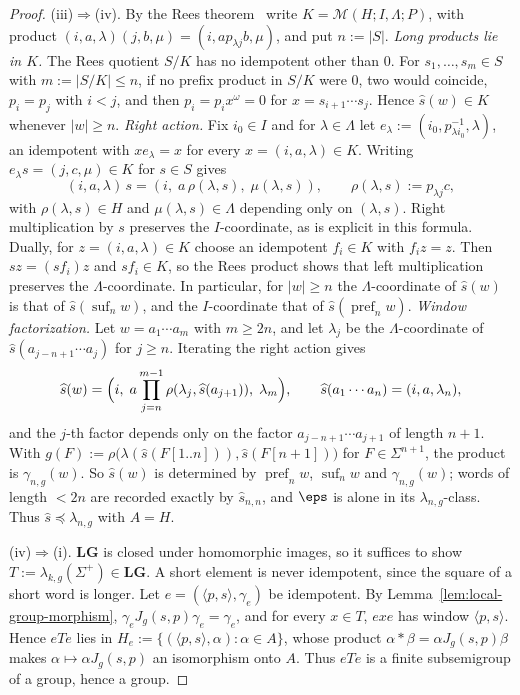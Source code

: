 \begin{proof}
(iii)$\Rightarrow$(iv).  By the Rees theorem~\cite{Howie1995} write
$K=\mathcal M(H;I,\Lambda;P)$, with product
$(i,a,\lambda)(j,b,\mu)=(i,ap_{\lambda j}b,\mu)$, and put $n:=|S|$.
\emph{Long products lie in $K$.}  The Rees quotient $S/K$ has no idempotent
other than $0$.  For $s_1,\ldots,s_m\in S$ with $m:=|S/K|\le n$, if no prefix
product in $S/K$ were $0$, two would coincide, $p_i=p_j$ with $i<j$, and then
$p_i=p_ix^\omega=0$ for $x=s_{i+1}\cdots s_j$.  Hence $\widehat{s}(w)\in K$ whenever
$|w|\ge n$.
\emph{Right action.}  Fix $i_0\in I$ and for $\lambda\in\Lambda$ let
$e_\lambda:=(i_0,p_{\lambda i_0}^{-1},\lambda)$, an idempotent with
$xe_\lambda=x$ for every $x=(i,a,\lambda)\in K$.  Writing
$e_\lambda s=(j,c,\mu)\in K$ for $s\in S$ gives
\[
 (i,a,\lambda)\,s=(i,\;a\,\rho(\lambda,s),\;\mu(\lambda,s)),
 \qquad \rho(\lambda,s):=p_{\lambda j}c,
\]
with $\rho(\lambda,s)\in H$ and $\mu(\lambda,s)\in\Lambda$ depending only on
$(\lambda,s)$.  Right multiplication by $s$ preserves the $I$-coordinate, as is
explicit in this formula.  Dually, for $z=(i,a,\lambda)\in K$
choose an idempotent $f_i\in K$ with $f_i z=z$.
Then $sz=(sf_i)z$ and $sf_i\in K$, so the Rees product shows that
left multiplication preserves the $\Lambda$-coordinate.  In
particular, for $|w|\ge n$ the $\Lambda$-coordinate of $\widehat{s}(w)$ is
that of $\widehat{s}(\operatorname{suf}_nw)$, and the $I$-coordinate that of
$\widehat{s}(\operatorname{pref}_nw)$.
\emph{Window factorization.}  Let $w=a_1\cdots a_m$ with $m\ge2n$, and let
$\lambda_j$ be the $\Lambda$-coordinate of $\widehat{s}(a_{j-n+1}\cdots a_j)$ for
$j\ge n$.  Iterating the right action gives
\[
 \widehat{s}(w)=\Bigl(i,\;a\prod_{j=n}^{m-1}\rho(\lambda_j,\widehat{s}(a_{j+1})),\;
 \lambda_m\Bigr),
 \qquad \widehat{s}(a_1\cdots a_n)=(i,a,\lambda_n),
\]
and the $j$-th factor depends only on the factor $a_{j-n+1}\cdots a_{j+1}$ of
length $n+1$.  With
$g(F):=\rho\bigl(\lambda(\widehat{s}(F[1..n])),\widehat{s}(F[n+1])\bigr)$ for
$F\in\Sigma^{n+1}$, the product is $\gamma_{n,g}(w)$.  So $\widehat{s}(w)$ is determined
by $\operatorname{pref}_nw$, $\operatorname{suf}_nw$ and $\gamma_{n,g}(w)$;
words of length $<2n$ are recorded exactly by $\widehat{s}_{n,n}$, and $\eps$ is
alone in its $\lambda_{n,g}$-class.  Thus $\widehat{s}\preceq\lambda_{n,g}$ with $A=H$.

(iv)$\Rightarrow$(i).  $\mathbf{LG}$ is closed under homomorphic images, so it
suffices to show $T:=\lambda_{k,g}(\Sigma^+)\in\mathbf{LG}$.  A short element
is never idempotent, since the square of a short word is longer.  Let
$e=(\langle p,s\rangle,\gamma_e)$ be idempotent.  By
Lemma~\ref{lem:local-group-morphism}, $\gamma_eJ_g(s,p)\gamma_e=\gamma_e$, and
for every $x\in T$, $exe$ has window $\langle p,s\rangle$.  Hence $eTe$ lies in
$H_e:=\{(\langle p,s\rangle,\alpha):\alpha\in A\}$, whose product
$\alpha*\beta=\alpha J_g(s,p)\beta$ makes $\alpha\mapsto\alpha J_g(s,p)$ an
isomorphism onto $A$.  Thus $eTe$ is a finite subsemigroup of a group, hence a
group.
\end{proof}

